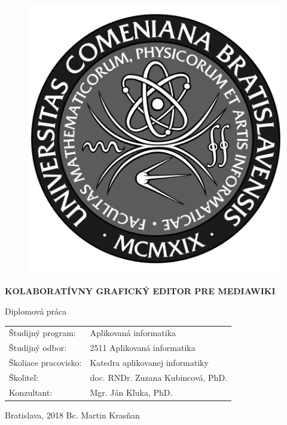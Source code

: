 \documentclass[12pt, a4paper, oneside]{book}
\newcommand\mftitle{Kolaboratívny grafický editor pre MediaWiki}
\newcommand\mfthesistype{Diplomová práca}
\newcommand\mfauthor{Bc. Martin Krasňan}
\newcommand\mfconsultant{Mgr. Ján Kľuka, PhD.}
\newcommand\mfadvisor{doc. RNDr. Zuzana Kubincová, PhD.}
\newcommand\mfplacedate{Bratislava, 2018}
\begin{document}
\vfill
\begin{figure}[!hbt]
\begin{center}
\includegraphics{images/base/logo_fmph_dark}
\label{img:logo_dark}
\end{center}
\end{figure}
\begin{center}
\begin{minipage}{0.8\textwidth}
\centerline{\textbf{\Large\MakeUppercase{\mftitle}}}
\smallskip
\centerline{\mfthesistype}
\end{minipage}
\end{center}
\vfill
\begin{tabular}{l l}
Študijný program: & Aplikovaná informatika\\
Študijný odbor: & 2511 Aplikovaná informatika\\
Školiace pracovisko: & Katedra aplikovanej informatiky\\
Školiteľ: & \mfadvisor\\
Konzultant: & \mfconsultant
\end{tabular}
\vfill
\noindent
\mfplacedate \hfill
\mfauthor
\eject 
\end{document}
